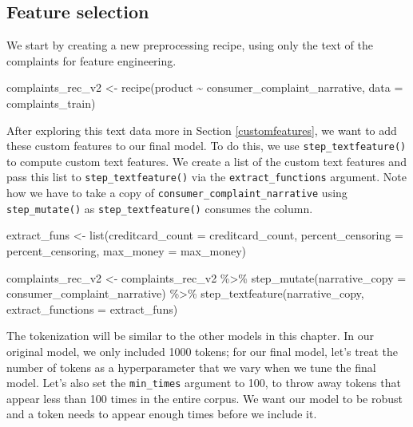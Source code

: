 \documentclass[
]{krantz}
\makeatletter
\newenvironment{Shaded}{\begin{snugshade}}{\end{snugshade}}
\newcommand{\AttributeTok}[1]{\textcolor[rgb]{0.77,0.63,0.00}{#1}}
\newcommand{\FunctionTok}[1]{\textcolor[rgb]{0.00,0.00,0.00}{#1}}
\newcommand{\NormalTok}[1]{#1}
\newcommand{\OtherTok}[1]{\textcolor[rgb]{0.56,0.35,0.01}{#1}}
\newcommand{\SpecialCharTok}[1]{\textcolor[rgb]{0.00,0.00,0.00}{#1}}
\newenvironment{kframe}{%
\medskip{}
\setlength{\fboxsep}{.8em}
 \def\at@end@of@kframe{}%
 \ifinner\ifhmode%
  \def\at@end@of@kframe{\end{minipage}}%
  \begin{minipage}{\columnwidth}%
 \fi\fi%
 \def\FrameCommand##1{\hskip\@totalleftmargin \hskip-\fboxsep
 \colorbox{shadecolor}{##1}\hskip-\fboxsep
     \hskip-\linewidth \hskip-\@totalleftmargin \hskip\columnwidth}%
 \MakeFramed {\advance\hsize-\width
   \@totalleftmargin\z@ \linewidth\hsize
   \@setminipage}}%
 {\par\unskip\endMakeFramed%
 \at@end@of@kframe}
\renewenvironment{Shaded}{\begin{kframe}}{\end{kframe}}
\makeatother
\begin{document}
\hypertarget{feature-selection}{%
\subsection{Feature selection}\label{feature-selection}}

We start by creating a new preprocessing recipe, using only the text of the complaints for feature engineering.

\begin{Shaded}
\begin{Highlighting}[]
\NormalTok{complaints\_rec\_v2 }\OtherTok{\textless{}{-}}
  \FunctionTok{recipe}\NormalTok{(product }\SpecialCharTok{\textasciitilde{}}\NormalTok{ consumer\_complaint\_narrative, }\AttributeTok{data =}\NormalTok{ complaints\_train)}
\end{Highlighting}
\end{Shaded}

After exploring this text data more in Section \ref{customfeatures}, we want to add these custom features to our final model.
To do this, we use \texttt{step\_textfeature()} to compute custom text features.
We create a list of the custom text features and pass this list to \texttt{step\_textfeature()} via the \texttt{extract\_functions} argument.
Note how we have to take a copy of \texttt{consumer\_complaint\_narrative} using \texttt{step\_mutate()} as \texttt{step\_textfeature()} consumes the column.

\begin{Shaded}
\begin{Highlighting}[]
\NormalTok{extract\_funs }\OtherTok{\textless{}{-}} \FunctionTok{list}\NormalTok{(}\AttributeTok{creditcard\_count =}\NormalTok{ creditcard\_count,}
                     \AttributeTok{percent\_censoring =}\NormalTok{ percent\_censoring,}
                     \AttributeTok{max\_money =}\NormalTok{ max\_money)}

\NormalTok{complaints\_rec\_v2 }\OtherTok{\textless{}{-}}\NormalTok{ complaints\_rec\_v2 }\SpecialCharTok{\%\textgreater{}\%}
  \FunctionTok{step\_mutate}\NormalTok{(}\AttributeTok{narrative\_copy =}\NormalTok{ consumer\_complaint\_narrative) }\SpecialCharTok{\%\textgreater{}\%}
  \FunctionTok{step\_textfeature}\NormalTok{(narrative\_copy, }\AttributeTok{extract\_functions =}\NormalTok{ extract\_funs)}
\end{Highlighting}
\end{Shaded}

The tokenization will be similar to the other models in this chapter.
In our original model, we only included 1000 tokens; for our final model, let's treat the number of tokens as a hyperparameter that we vary when we tune the final model.
Let's also set the \texttt{min\_times} argument to 100, to throw away tokens that appear less than 100 times in the entire corpus.
We want our model to be robust and a token needs to appear enough times before we include it.
\end{document}
